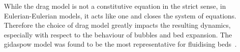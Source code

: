 While the drag model is not a constitutive equation in the strict sense, in Eulerian-Eulerian models, it acts like one and closes the system of equations. Therefore the choice of drag model greatly impacts the resulting dynamics, especially with respect to the behaviour of bubbles and bed expansion. The gidaspow model was found to be the most representative for fluidising beds~\cite{C6RA28615A}.

